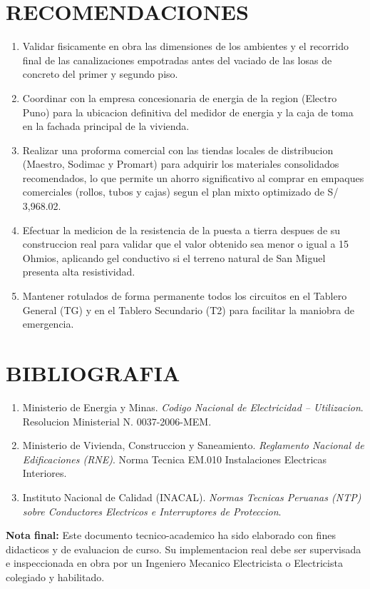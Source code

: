 \section{RECOMENDACIONES}

\begin{enumerate}
  \item Validar fisicamente en obra las dimensiones de los ambientes y el recorrido final de las canalizaciones empotradas antes del vaciado de las losas de concreto del primer y segundo piso.
  \item Coordinar con la empresa concesionaria de energia de la region (Electro Puno) para la ubicacion definitiva del medidor de energia y la caja de toma en la fachada principal de la vivienda.
  \item Realizar una proforma comercial con las tiendas locales de distribucion (Maestro, Sodimac y Promart) para adquirir los materiales consolidados recomendados, lo que permite un ahorro significativo al comprar en empaques comerciales (rollos, tubos y cajas) segun el plan mixto optimizado de S/ 3,968.02.
  \item Efectuar la medicion de la resistencia de la puesta a tierra despues de su construccion real para validar que el valor obtenido sea menor o igual a 15 Ohmios, aplicando gel conductivo si el terreno natural de San Miguel presenta alta resistividad.
  \item Mantener rotulados de forma permanente todos los circuitos en el Tablero General (TG) y en el Tablero Secundario (T2) para facilitar la maniobra de emergencia.
\end{enumerate}

\section{BIBLIOGRAFIA}

\begin{enumerate}
  \item Ministerio de Energia y Minas. \textit{Codigo Nacional de Electricidad -- Utilizacion}. Resolucion Ministerial N. 0037-2006-MEM.
  \item Ministerio de Vivienda, Construccion y Saneamiento. \textit{Reglamento Nacional de Edificaciones (RNE)}. Norma Tecnica EM.010 Instalaciones Electricas Interiores.
  \item Instituto Nacional de Calidad (INACAL). \textit{Normas Tecnicas Peruanas (NTP) sobre Conductores Electricos e Interruptores de Proteccion}.
\end{enumerate}

\bigskip
\noindent\textbf{Nota final:} Este documento tecnico-academico ha sido elaborado con fines didacticos y de evaluacion de curso. Su implementacion real debe ser supervisada e inspeccionada en obra por un Ingeniero Mecanico Electricista o Electricista colegiado y habilitado.
